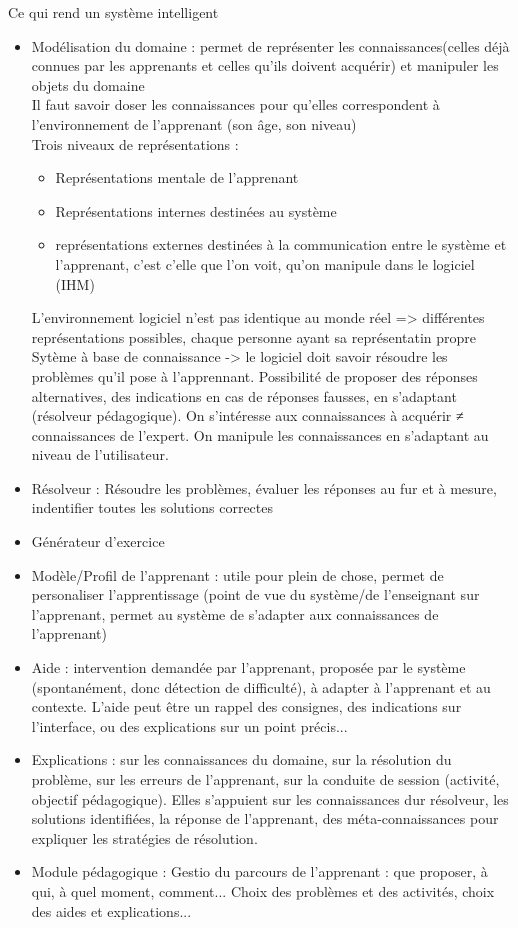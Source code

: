
Ce qui rend un système intelligent

\begin{itemize}
	\item Modélisation du domaine : permet de représenter les connaissances(celles déjà connues par les apprenants et celles qu'ils doivent acquérir) et manipuler les objets du domaine\\
	Il faut savoir doser les connaissances pour qu'elles correspondent à l'environnement de l'apprenant (son âge, son niveau)\\
	Trois niveaux de représentations :
	\begin{itemize}
		\item Représentations mentale de l'apprenant
		\item Représentations internes destinées au système
		\item représentations externes destinées à la communication entre le système et l'apprenant, c'est c'elle que l'on voit, qu'on manipule dans le logiciel (IHM)
	\end{itemize}
	L'environnement logiciel n'est pas identique au monde réel => différentes représentations possibles, chaque personne ayant sa représentatin propre\\
	Sytème à base de connaissance -> le logiciel doit savoir résoudre les problèmes qu'il pose à l'apprennant. Possibilité de proposer des réponses alternatives, des indications en cas de réponses fausses, en s'adaptant (résolveur pédagogique). On s'intéresse aux connaissances à acquérir ≠ connaissances de l'expert. On manipule les connaissances en s'adaptant au niveau de l'utilisateur.
	\item Résolveur : Résoudre les problèmes, évaluer les réponses au fur et à mesure, indentifier toutes les solutions correctes

	\item Générateur d'exercice
	\item Modèle/Profil de l'apprenant : utile pour plein de chose, permet de personaliser l'apprentissage (point de vue du système/de l'enseignant sur l'apprenant, permet au système de s'adapter aux connaissances de l'apprenant)
	\item Aide : intervention demandée par l'apprenant, proposée par le système (spontanément, donc détection de difficulté), à adapter à l'apprenant et au contexte. L'aide peut être un rappel des consignes, des indications sur l'interface, ou des explications sur un point précis...
	\item Explications : sur les connaissances du domaine, sur la résolution du problème, sur les erreurs de l'apprenant, sur la conduite de session (activité, objectif pédagogique). Elles s'appuient sur les connaissances dur résolveur, les solutions identifiées, la réponse de l'apprenant, des méta-connaissances pour expliquer les stratégies de résolution.
	\item Module pédagogique : Gestio du parcours de l'apprenant : que proposer, à qui, à quel moment, comment... Choix des problèmes et des activités, choix des aides et explications...


\end{itemize}
